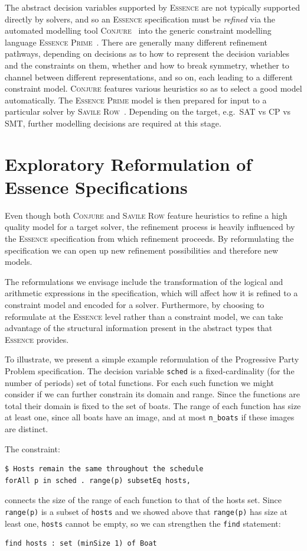 \documentclass[a4paper,UKenglish,cleveref, autoref,pdfa]{lipics-v2021}
\newcommand{\code}[1]{{\lstinline!#1!}}
\newcommand{\essence}[0]{\textsc{Essence}\xspace}
\newcommand{\conjure}[0]{\textsc{Conjure}\xspace}
\newcommand{\eprime}[0]{\textsc{Essence Prime}\xspace}
\newcommand{\savilerow}[0]{\textsc{Savile Row}\xspace}
\begin{document}
The abstract decision variables supported by \essence are not typically supported directly by solvers, and so an \essence specification must be {\em refined} via the automated modelling tool \conjure~\cite{Akgun2022:Conjure} into the generic constraint modelling language \eprime~\cite{sr-manual}.
There are generally many different refinement pathways, depending on decisions as to how to represent the decision variables and the constraints on them, whether and how to break symmetry, whether to channel between different representations, and so on, each leading to a different constraint model. \conjure features various heuristics so as to select a good model automatically. The \eprime
model is then prepared for input to a particular solver by \savilerow~\cite{savilerow}. Depending on the target, e.g.~SAT vs CP vs SMT, further modelling decisions are required at this stage. 


\section{Exploratory Reformulation of Essence Specifications}

Even though both \conjure and \savilerow feature heuristics to refine a high quality model for a target solver, the refinement process is heavily influenced by the \essence specification from which refinement proceeds. By reformulating the specification we can open up new refinement possibilities and therefore new models. 

The reformulations we envisage include the transformation of the logical and arithmetic expressions in the specification, which will affect how it is refined to a constraint model and encoded for a solver. Furthermore, by choosing to reformulate at the \essence level rather than a constraint model, we can take advantage of the structural information present in the abstract types that \essence provides.

To illustrate, we present a simple example reformulation of the Progressive Party Problem specification. The decision variable \code{sched} is a fixed-cardinality (for the number of periods) set of total functions. For each such function we might consider if we can further constrain its domain and range. Since the functions are total their domain is fixed to the set of boats. The range of each function has size at least one, since all boats have an image, and at most \code{n_boats} if these images are distinct.

The constraint:
\begin{lstlisting}
$ Hosts remain the same throughout the schedule
forAll p in sched . range(p) subsetEq hosts,
\end{lstlisting}
connects the size of the range of each function to that of the hosts set. Since \code{range(p)} is a subset of \code{hosts} and we showed above that \code{range(p)} has size at least one, \code{hosts} cannot be empty, so we can strengthen the \code{find} statement:
\begin{lstlisting}
find hosts : set (minSize 1) of Boat
\end{lstlisting}
\end{document}
